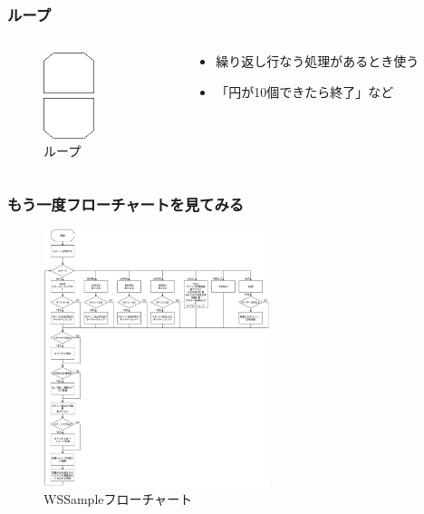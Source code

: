 \documentclass[10pt, dvipdfmx]{beamer}
\begin{document}
        \begin{frame}
            \frametitle{ループ}
            \begin{columns}[c]
                \begin{column}{0.50\textwidth}
                    \begin{figure}[htb]
                        \includegraphics[height=25mm]{images/loop.jpg}
                        \caption{ループ}
                        \label{fig:09}
                    \end{figure}
                \end{column}
                \begin{column}{0.50\textwidth}
                    \begin{block}{}
                        \begin{itemize}
                            \item 繰り返し行なう処理があるとき使う
                            \item 「円が10個できたら終了」など
                        \end{itemize}
                    \end{block}
                \end{column}
            \end{columns}
        \end{frame}

        \begin{frame}
            \frametitle{もう一度フローチャートを見てみる}
            \begin{figure}[htb]
                 \includegraphics[height=75mm]{images/WSSampleFlowChart.jpg}
                 \caption{WSSampleフローチャート}
                \label{fig:10}
            \end{figure}
        \end{frame}
\end{document}
